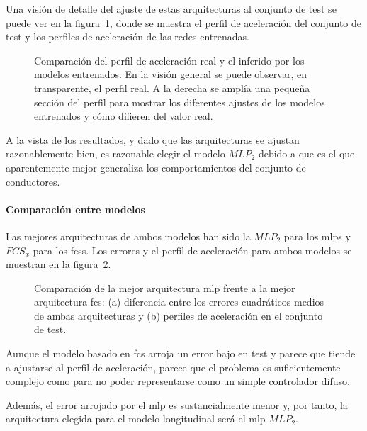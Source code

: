Una visión de detalle del ajuste de estas arquitecturas al conjunto de test se puede ver en la figura~\ref{fig:mlp-test-comparisons}, donde se muestra el perfil de aceleración del conjunto de test y los perfiles de aceleración de las redes entrenadas.

\begin{figure}
	\centering
	\qquad
	\caption[Comparación del perfil de aceleración real y el inferido por los modelos entrenados]{Comparación del perfil de aceleración real y el inferido por los modelos entrenados. En la visión general se puede observar, en transparente, el perfil real. A la derecha se amplía una pequeña sección del perfil para mostrar los diferentes ajustes de los modelos entrenados y cómo difieren del valor real.}
	\label{fig:mlp-test-comparisons}
\end{figure}

A la vista de los resultados, y dado que las arquitecturas se ajustan razonablemente bien, es razonable elegir el modelo $MLP_2$ debido a que es el que aparentemente mejor generaliza los comportamientos del conjunto de conductores.

\paragraph{Comparación entre modelos}

Las mejores arquitecturas de ambos modelos han sido la $MLP_2$ para los \acp{mlp} y $FCS_x$ para los \acp{fcs}. Los errores y el perfil de aceleración para ambos modelos se muestran en la figura~\ref{fig:comparison-between-best-mlp-and-fcs-architecture}.

\begin{figure}
	\centering
	\qquad
	\caption[Comparación entre los dos tipos de modelo longitudinal]{Comparación de la mejor arquitectura \ac{mlp} frente a la mejor arquitectura \ac{fcs}: (a) diferencia entre los errores cuadráticos medios de ambas arquitecturas y (b) perfiles de aceleración en el conjunto de test.}
	\label{fig:comparison-between-best-mlp-and-fcs-architecture}
\end{figure}

Aunque el modelo basado en \ac{fcs} arroja un error bajo en test y parece que tiende a ajustarse al perfil de aceleración, parece que el problema es suficientemente complejo como para no poder representarse como un simple controlador difuso.

Además, el error arrojado por el \ac{mlp} es sustancialmente menor y, por tanto, la arquitectura elegida para el modelo longitudinal será el \ac{mlp} $MLP_2$.